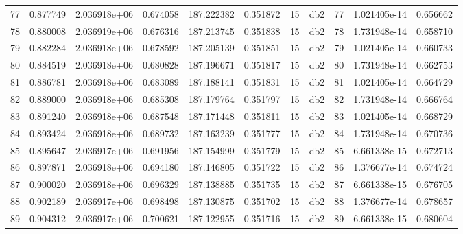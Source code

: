 \begin{tabular}{lrrrrrrlrrr}
77   &    0.877749 &        2.036918e+06 &  0.674058 &              187.222382 &    0.351872 &      15 &          db2 &     77 &   1.021405e-14 &      0.656662 \\
78   &    0.880008 &        2.036919e+06 &  0.676316 &              187.213745 &    0.351838 &      15 &          db2 &     78 &   1.731948e-14 &      0.658710 \\
79   &    0.882284 &        2.036918e+06 &  0.678592 &              187.205139 &    0.351851 &      15 &          db2 &     79 &   1.021405e-14 &      0.660733 \\
80   &    0.884519 &        2.036918e+06 &  0.680828 &              187.196671 &    0.351817 &      15 &          db2 &     80 &   1.731948e-14 &      0.662753 \\
81   &    0.886781 &        2.036918e+06 &  0.683089 &              187.188141 &    0.351831 &      15 &          db2 &     81 &   1.021405e-14 &      0.664729 \\
82   &    0.889000 &        2.036918e+06 &  0.685308 &              187.179764 &    0.351797 &      15 &          db2 &     82 &   1.731948e-14 &      0.666764 \\
83   &    0.891240 &        2.036918e+06 &  0.687548 &              187.171448 &    0.351811 &      15 &          db2 &     83 &   1.021405e-14 &      0.668729 \\
84   &    0.893424 &        2.036918e+06 &  0.689732 &              187.163239 &    0.351777 &      15 &          db2 &     84 &   1.731948e-14 &      0.670736 \\
85   &    0.895647 &        2.036917e+06 &  0.691956 &              187.154999 &    0.351779 &      15 &          db2 &     85 &   6.661338e-15 &      0.672713 \\
86   &    0.897871 &        2.036918e+06 &  0.694180 &              187.146805 &    0.351722 &      15 &          db2 &     86 &   1.376677e-14 &      0.674724 \\
87   &    0.900020 &        2.036918e+06 &  0.696329 &              187.138885 &    0.351735 &      15 &          db2 &     87 &   6.661338e-15 &      0.676705 \\
88   &    0.902189 &        2.036917e+06 &  0.698498 &              187.130875 &    0.351702 &      15 &          db2 &     88 &   1.376677e-14 &      0.678657 \\
89   &    0.904312 &        2.036917e+06 &  0.700621 &              187.122955 &    0.351716 &      15 &          db2 &     89 &   6.661338e-15 &      0.680604 \\

\end{tabular}
